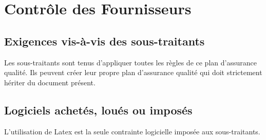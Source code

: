 \section{Contrôle des Fournisseurs}

\subsection{Exigences vis-à-vis des sous-traitants}
Les sous-traitants sont tenus d'appliquer toutes les règles de ce plan d'assurance qualité.
Ils peuvent créer leur propre plan d'assurance qualité qui doit strictement hériter du document présent.
\subsection{Logiciels achetés, loués ou imposés}
L'utilisation de Latex est la seule contrainte logicielle imposée aux sous-traitants.
\vfill
\pagebreak
